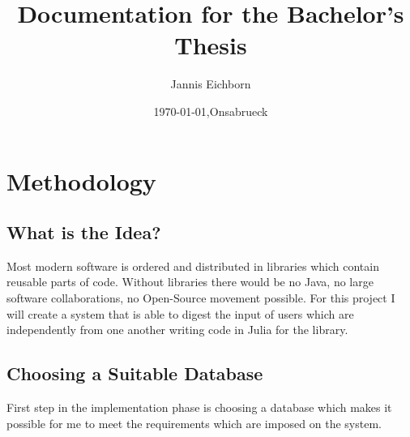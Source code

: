 \documentclass[12pt]{scrartcl}
\title{Documentation for the Bachelor's Thesis}
\subtitle{}
\author{Jannis Eichborn}
\date{\today{},Onsabrueck}
\begin{document}
\begin{titlepage}
\maketitle
\tableofcontents
\end{titlepage}


\section{Methodology}
\subsection{What is the Idea?}
Most modern software is ordered and distributed in libraries which contain reusable parts of code. Without libraries there would be no Java, no large software collaborations, no Open-Source movement possible. 
For this project I will create a system that is able to digest the input of users which are independently from one another writing code in Julia for the library.
\subsection{Choosing a Suitable Database}
First step in the implementation phase is choosing a database which makes it possible for me to meet the requirements which are imposed on the system.
\end{document}
